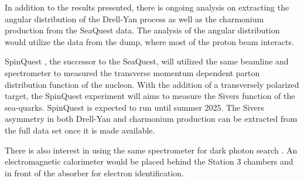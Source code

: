 \documentclass[../main.tex]{subfiles}
\begin{document}
In addition to the results presented, there is ongoing analysis on extracting
the angular distribution of the Drell-Yan process as well as the charmonium
production from the SeaQuest data. The analysis of the angular distribution would
utilize the data from the dump, where most of the proton beam interacts.

SpinQuest \cite{geesaman2014}, the successor to the SeaQuest, will utilized the same beamline and
spectrometer to measured the transverse momentum dependent parton distribution
function of the nucleon. With the addition of a transversely polarized 
target, the SpinQuest experiment will aims to measure the Sivers function of the
sea-quarks.
SpinQuest is expected to run until summer 2025. The Sivers
asymmetry in both Drell-Yan and charmonium production can be extracted from the full
data set once it is made available.

There is also interest in using the same spectrometer for dark photon search
\cite{apyan2022}. An electromagnetic calorimeter would be placed behind the
Station 3 chambers and in front of the absorber for electron identification.

\ifSubfilesClassLoaded{ \printbibliography[heading=bibintoc,title={References}]}{}
\end{document}
